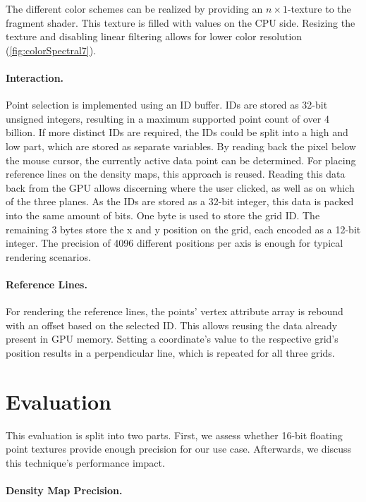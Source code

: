 \documentclass[sigconf]{acmart}
\begin{document}
The different color schemes can be realized by providing an $n \times 1$-texture to the fragment shader.
This texture is filled with values on the CPU side.
Resizing the texture and disabling linear filtering allows for lower color resolution (\autoref{fig:colorSpectral7}).

\paragraph{Interaction.}

Point selection is implemented using an ID buffer.
IDs are stored as 32-bit unsigned integers, resulting in a maximum supported point count of over 4 billion.
If more distinct IDs are required, the IDs could be split into a high and low part, which are stored as separate variables.
By reading back the pixel below the mouse cursor, the currently active data point can be determined.
For placing reference lines on the density maps, this approach is reused.
Reading this data back from the GPU allows discerning where the user clicked, as well as on which of the three planes.
As the IDs are stored as a 32-bit integer, this data is packed into the same amount of bits.
One byte is used to store the grid ID.
The remaining 3 bytes store the x and y position on the grid, each encoded as a 12-bit integer.
The precision of 4096 different positions per axis is enough for typical rendering scenarios.

\paragraph{Reference Lines.}
For rendering the reference lines, the points' vertex attribute array is rebound with an offset based on the selected ID.
This allows reusing the data already present in GPU memory.
Setting a coordinate's value to the respective grid's position results in a perpendicular line, which is repeated for all three grids.

\section{Evaluation}
\label{sec:eval}

This evaluation is split into two parts. First, we assess whether 16-bit floating point textures provide enough precision for our use case. Afterwards, we discuss this technique's performance impact.

\paragraph{Density Map Precision.}
\end{document}
